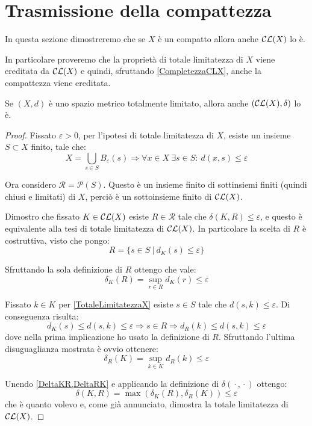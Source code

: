 \section{Trasmissione della compattezza}
In questa sezione dimostreremo che se $X$ è un compatto allora anche $\mathcal{CL}(X)$ lo è. 

In particolare proveremo che la proprietà di totale limitatezza di $X$ viene ereditata da $\mathcal{CL}(X)$ e quindi, sfruttando \cref{CompletezzaCLX}, anche la compattezza viene ereditata.

\begin{lemma}\label{TotaleLimitatezzaCLX}
	Se $(X,d)$ è uno spazio metrico totalmente limitato, allora anche $(\mathcal{CL}(X),\delta)$ lo è.
\end{lemma}
\begin{proof}
	Fissato $\varepsilon>0$, per l'ipotesi di totale limitatezza di $X$, esiste un insieme $S\subset X$ finito, tale che:
	\begin{equation}\label{TotaleLimitatezzaX}
		X=\bigcup_{s\in S} B_{\varepsilon}(s) \Longrightarrow 
		\forall x\in X\ \exists s\in S:\ d(x,s)\le \varepsilon
	\end{equation}

	Ora considero $\mathcal{R}=\mathcal{P}(S)$. Questo è un insieme finito di sottinsiemi finiti (quindi chiusi e limitati) di $X$, perciò è un sottoinsieme finito di $\mathcal{CL}(X)$. 
	
	Dimostro che fissato $K\in\mathcal{CL}(X)$ esiste $R\in \mathcal{R}$ tale che $\delta(K,R)\le \varepsilon$, e questo è equivalente alla tesi di totale limitatezza di $\mathcal{CL}(X)$. In particolare la scelta di $R$ è costruttiva, visto che pongo:
	\begin{equation*}
		R=\{s\in S\ |\ d_K(s)\le \varepsilon\}
	\end{equation*}
	
	Sfruttando la sola definizione di $R$ ottengo che vale:
	\begin{equation}\label{DeltaKR}
		\delta_K(R)=\sup_{r\in R} d_K(r) \le \varepsilon
	\end{equation}
	
	Fissato $k\in K$ per \cref{TotaleLimitatezzaX} esiste $s\in S$ tale che $d(s,k)\le \varepsilon$. Di conseguenza risulta:
	\begin{equation*}
		d_K(s)\le d(s,k) \le \varepsilon \Longrightarrow s\in R \Longrightarrow d_R(k)\le d(s,k)\le \varepsilon
	\end{equation*}
	dove nella prima implicazione ho usato la definizione di $R$. 
	Sfruttando l'ultima disuguaglianza mostrata è ovvio ottenere:
	\begin{equation}\label{DeltaRK}
		\delta_R(K)=\sup_{k\in K} d_R(k) \le  \varepsilon
	\end{equation}
	
	Unendo \cref{DeltaKR,DeltaRK} e applicando la definizione di $\delta({}\cdot{},{}\cdot{})$ ottengo:
	\begin{equation*}
		\delta(K,R)=\max\left(\delta_K(R),\delta_R(K)\right)\le \varepsilon
	\end{equation*}
	che è quanto volevo e, come già annunciato, dimostra la totale limitatezza di $\mathcal{CL}(X)$.
\end{proof}

